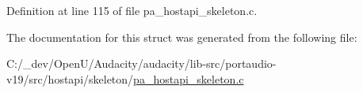 Definition at line 115 of file pa\+\_\+hostapi\+\_\+skeleton.\+c.



The documentation for this struct was generated from the following file\+:\begin{DoxyCompactItemize}
\item 
C\+:/\+\_\+dev/\+Open\+U/\+Audacity/audacity/lib-\/src/portaudio-\/v19/src/hostapi/skeleton/\hyperlink{pa__hostapi__skeleton_8c}{pa\+\_\+hostapi\+\_\+skeleton.\+c}\end{DoxyCompactItemize}
